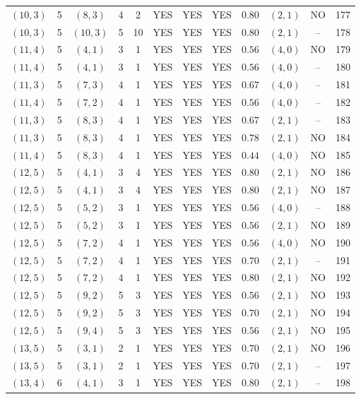 \begin{longtable}{|c|c|c|c|c|c|c|c|c|c|c|c|}
$(10,3)$ & 5 & $(8,3)$ & 4 & 2 & YES & YES & YES & $0.80$ & $(2,1)$ & NO & 177\\
$(10,3)$ & 5 & $(10,3)$ & 5 & 10 & YES & YES & YES & $0.80$ & $(2,1)$ & -- & 178\\
$(11,4)$ & 5 & $(4,1)$ & 3 & 1 & YES & YES & YES & $0.56$ & $(4,0)$ & NO & 179\\
$(11,4)$ & 5 & $(4,1)$ & 3 & 1 & YES & YES & YES & $0.56$ & $(4,0)$ & -- & 180\\
$(11,3)$ & 5 & $(7,3)$ & 4 & 1 & YES & YES & YES & $0.67$ & $(4,0)$ & -- & 181\\
$(11,4)$ & 5 & $(7,2)$ & 4 & 1 & YES & YES & YES & $0.56$ & $(4,0)$ & -- & 182\\
$(11,3)$ & 5 & $(8,3)$ & 4 & 1 & YES & YES & YES & $0.67$ & $(2,1)$ & -- & 183\\
$(11,3)$ & 5 & $(8,3)$ & 4 & 1 & YES & YES & YES & $0.78$ & $(2,1)$ & NO & 184\\
$(11,4)$ & 5 & $(8,3)$ & 4 & 1 & YES & YES & YES & $0.44$ & $(4,0)$ & NO & 185\\
$(12,5)$ & 5 & $(4,1)$ & 3 & 4 & YES & YES & YES & $0.80$ & $(2,1)$ & NO & 186\\
$(12,5)$ & 5 & $(4,1)$ & 3 & 4 & YES & YES & YES & $0.80$ & $(2,1)$ & NO & 187\\
$(12,5)$ & 5 & $(5,2)$ & 3 & 1 & YES & YES & YES & $0.56$ & $(4,0)$ & -- & 188\\
$(12,5)$ & 5 & $(5,2)$ & 3 & 1 & YES & YES & YES & $0.56$ & $(2,1)$ & NO & 189\\
$(12,5)$ & 5 & $(7,2)$ & 4 & 1 & YES & YES & YES & $0.56$ & $(4,0)$ & NO & 190\\
$(12,5)$ & 5 & $(7,2)$ & 4 & 1 & YES & YES & YES & $0.70$ & $(2,1)$ & -- & 191\\
$(12,5)$ & 5 & $(7,2)$ & 4 & 1 & YES & YES & YES & $0.80$ & $(2,1)$ & NO & 192\\
$(12,5)$ & 5 & $(9,2)$ & 5 & 3 & YES & YES & YES & $0.56$ & $(2,1)$ & NO & 193\\
$(12,5)$ & 5 & $(9,2)$ & 5 & 3 & YES & YES & YES & $0.70$ & $(2,1)$ & NO & 194\\
$(12,5)$ & 5 & $(9,4)$ & 5 & 3 & YES & YES & YES & $0.56$ & $(2,1)$ & NO & 195\\
$(13,5)$ & 5 & $(3,1)$ & 2 & 1 & YES & YES & YES & $0.70$ & $(2,1)$ & NO & 196\\
$(13,5)$ & 5 & $(3,1)$ & 2 & 1 & YES & YES & YES & $0.70$ & $(2,1)$ & -- & 197\\
$(13,4)$ & 6 & $(4,1)$ & 3 & 1 & YES & YES & YES & $0.80$ & $(2,1)$ & -- & 198\\

\end{longtable}
